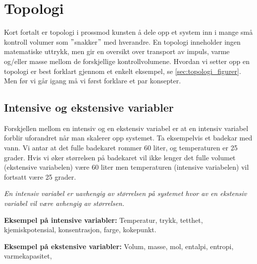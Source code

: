 \section{Topologi}\label{sec:topologi}
Kort fortalt er topologi i prossmod kunsten å dele opp et system inn i mange små kontroll volumer som $"$snakker$"$ med hverandre. En topologi inneholder ingen matematiske uttrykk, men gir en oversikt over transport av impuls, varme og/eller masse mellom de forskjellige kontrollvolumene. Hvordan vi setter opp en topologi er best forklart gjennom et enkelt eksempel, se \cref{sec:topologi_figurer}. Men før vi går igang må vi først forklare et par konsepter.

\subsection{Intensive og ekstensive variabler}
\label{sec:ekstensive_intensive}
Forskjellen mellom en intensiv og en ekstensiv variabel er at en intensiv variabel forblir uforandret når man skalerer opp systemet. Ta eksempelvis et badekar med vann. Vi antar at det fulle badekaret rommer 60 liter, og temperaturen er 25 grader. Hvis vi øker størrelsen på badekaret vil ikke lenger det fulle volumet (ekstensive variabelen) være 60 liter men temperaturen (intensive variabelen) vil fortsatt være 25 grader. 

\begin{center}
    \textit{En intensiv variabel er uavhengig av størrelsen på systemet hvor av en ekstensiv variabel vil være avhengig av størrelsen. }
\end{center}

\textbf{Eksempel på intensive variabler:} Temperatur, trykk, tetthet, kjemiskpotensial, konsentrasjon, farge, kokepunkt.

\textbf{Eksempel på ekstensive variabler:} Volum, masse, mol, entalpi, entropi, varmekapasitet, 


\clearpage
